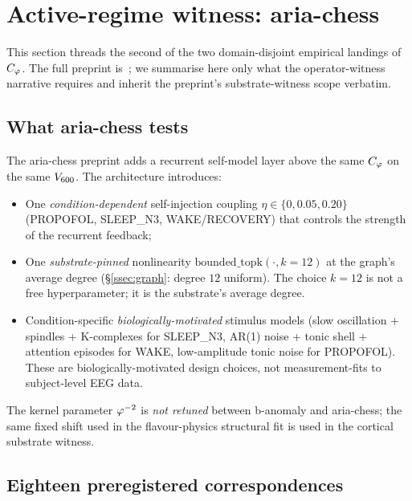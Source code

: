 \section{Active-regime witness: aria-chess}\label{sec:active_witness}

This section threads the second of the two domain-disjoint empirical landings of
$C_{\varphi}$. The full preprint is~\citep{SmartAriaChess2026}; we
summarise here only what the operator-witness narrative requires
and inherit the preprint's substrate-witness scope verbatim.

\subsection{What aria-chess tests}\label{ssec:aria_setup}

The aria-chess preprint adds a recurrent self-model layer above
the same $C_{\varphi}$ on the same $V_{600}$. The architecture
introduces:
\begin{itemize}\itemsep=2pt
\item One \emph{condition-dependent} self-injection coupling
  $\eta \in \{0, 0.05, 0.20\}$ (PROPOFOL, SLEEP\_N3,
  WAKE/RECOVERY) that controls the strength of the recurrent
  feedback;
\item One \emph{substrate-pinned} nonlinearity
  $\mathrm{bounded\_topk}(\cdot, k=12)$ at the graph's average
  degree (\S\ref{ssec:graph}: degree $12$ uniform). The choice
  $k=12$ is not a free hyperparameter; it is the substrate's
  average degree.
\item Condition-specific \emph{biologically-motivated} stimulus
  models (slow oscillation + spindles + K-complexes for SLEEP\_N3,
  AR(1) noise + tonic shell + attention episodes for WAKE,
  low-amplitude tonic noise for PROPOFOL). These are
  biologically-motivated design choices, not measurement-fits to
  subject-level EEG data.
\end{itemize}
The kernel parameter $\varphi^{-2}$ is \emph{not retuned} between
b-anomaly and aria-chess; the same fixed shift used in the
flavour-physics structural fit is used in the cortical substrate
witness.

\subsection{Eighteen preregistered correspondences}


